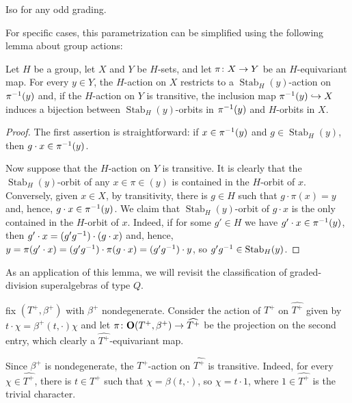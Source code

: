 \begin{cor}
    Iso for any odd grading.
\end{cor}

For specific cases, this parametrization can be simplified using the following lemma about group actions: 

\begin{lemma}\label{lemma:lemma-on-actions}
    Let $H$ be a group, let $X$ and $Y$ be $H$-sets, and let $\pi\colon X \to Y$ be an $H$-equivariant map. 
    For every $y \in Y$, the $H$-action on $X$ restricts to a $\operatorname{Stab}_H (y)$-action on $\pi^{-1}(y)$ and, if the $H$-action on $Y$ is transitive, the inclusion map $\pi^{-1}(y) \hookrightarrow X$ induces a bijection between $\operatorname{Stab}_H (y)$-orbits in $\pi^{-1}(y)$ and $H$-orbits in $X$.  
\end{lemma}

\begin{proof}
    The first assertion is straightforward: if $x\in \pi^{-1}(y)$ and $g \in \operatorname{Stab}_H (y)$, then $g \cdot x \in \pi^{-1}(y)$. 
    
    Now suppose that the $H$-action on $Y$ is transitive. 
    It is clearly that the $\operatorname{Stab}_H (y)$-orbit of any $x\in \pi\in(y)$ is contained in the $H$-orbit of $x$. Conversely, given $x\in X$, by transitivity, there is $g\in H$ such that $g \cdot \pi(x) = y$ and, hence, $g\cdot x \in \pi^{-1} (y)$. 
    We claim that $\operatorname{Stab}_H (y)$-orbit of $g\cdot x$ is the only contained in the $H$-orbit of $x$. 
    Indeed, if for some $g'\in H$ we have $g'\cdot x \in \pi^{-1}(y)$, then $g'\cdot x = (g'g^{-1})\cdot (g\cdot x)$ and, hence, $y = \pi(g'\cdot x) = (g'g^{-1})\cdot \pi(g\cdot x) = (g'g^{-1}) \cdot y$, so $g'g^{-1} \in \operatorname{Stab}_H (y)$.
\end{proof}

As an application of this lemma, we will revisit the classification of graded-division superalgebras of type $Q$. 

fix $(T^+, \beta^+)$ with $\beta^+$ nondegenerate. 
Consider the action of $T^+$ on $\widehat{T^+}$ given by $t\cdot \chi = \beta^+(t,\cdot) \chi$ and let $\pi\colon \mathbf {O} (T^+, \beta^+) \to \widehat{T^+}$ be the projection on the second entry, which clearly a $\widehat{T^+}$-equivariant map. 

Since $\beta^+$ is nondegenerate, the $T^+$-action on $\widehat{T^+}$ is transitive. 
Indeed, for every $\chi \in \widehat{T^+}$, there is $t \in T^+$ such that $\chi = \beta(t, \cdot)$, so $\chi = t \cdot 1$, where $1\in \widehat{T^+}$ is the trivial character. 

